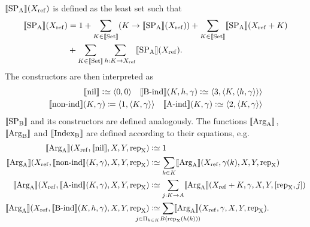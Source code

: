 \documentclass{article}
\begin{document}
$\llbracket \text{SP}_{\mathrm{A}} \rrbracket(X_{\mathrm{ref}})$ is defined as the least set such that
\begin{align*}
\llbracket \text{SP}_{\mathrm{A}} \rrbracket(X_{\mathrm{ref}}) &= 1 + \sum_{K \in \llbracket \text{Set} \rrbracket}(K \to \llbracket \text{SP}_{\mathrm{A}} \rrbracket(X_{\mathrm{ref}}))
  + \sum_{K \in \llbracket \text{Set} \rrbracket}\llbracket \text{SP}_{\mathrm{A}} \rrbracket(X_{\mathrm{ref}} + K) \\
 & {} + \sum_{K \in \llbracket \text{Set} \rrbracket}\sum_{h : K \to X_{\mathrm{ref}}}\llbracket \text{SP}_{\mathrm{A}} \rrbracket(X_{\mathrm{ref}}).
\end{align*}
%
The constructors are then interpreted as
%
\begin{align*}
 \llbracket \text{nil} \rrbracket \mathrel{\mathop:}\simeq \langle 0, 0\rangle \quad
 \llbracket \text{B-ind} \rrbracket(K, h, \gamma) \mathrel{\mathop:}\simeq \langle 3 , \langle K, \langle h, \gamma \rangle\rangle\rangle
   \\
  \llbracket \text{non-ind} \rrbracket(K, \gamma) \coloneqq \langle 1 , \langle K, \gamma
  \rangle\rangle \quad \llbracket \text{A-ind} \rrbracket(K, \gamma) \mathrel{\mathop:}\simeq \langle 2 , \langle K, \gamma \rangle\rangle
\end{align*}
$\llbracket \text{SP}_{\mathrm{B}} \rrbracket$ and its constructors are defined analogously. The
functions $\llbracket \text{Arg}_{\mathrm{A}} \rrbracket$, $\llbracket \text{Arg}_{\mathrm{B}} \rrbracket$ and $\llbracket \text{Index}_{\mathrm{B}} \rrbracket$ are defined
according to their equations, e.g.\
\begin{align*}
  \sem{\ArgA}(\Xref, \sem{\nilA}, X, Y, \repA) &\colonsimeq 1 \\
\sem{\ArgA}(\Xref, \sem{\nonindA}(K, \gamma), X, Y, \repA) &\colonsimeq
  \sum_{k \in K} \sem{\ArgA}(\Xref, \gamma(k), X, Y, \repA) \\
\sem{\ArgA}(\Xref, \sem{\AindA}(K, \gamma), X, Y, \repA) &\colonsimeq
  \sum_{j : K \to A}\sem{\ArgA}(\Xref + K, \gamma, X, Y, [\repA, j]) \\
\sem{\ArgA}(\Xref, \sem{\BindA}(K, h, \gamma), X, Y, \repA) &\colonsimeq
  \sum_{\mathclap{j \in \Pi_{k \in K} B(\repA (h(k)))}}\sem{\ArgA}(\Xref, \gamma, X, Y, \repA).
\end{align*}
%
%
\end{document}
